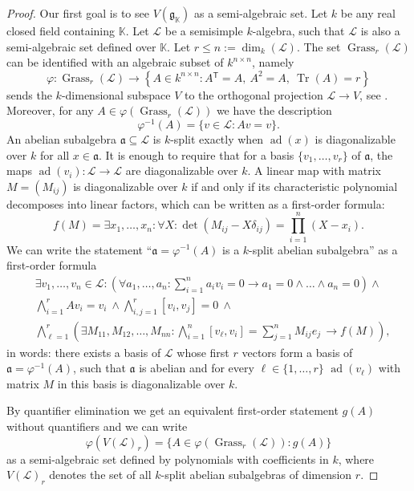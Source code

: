 \documentclass[12pt]{amsart}
\newcommand{\K}{\mathbb{K}}
\newcommand{\frakg}{\mathfrak{g}}
\newcommand{\fraka}{\mathfrak{a}}
\newcommand{\eL}{\mathcal{L}}
\newcommand{\tran}{{^{\mathsf{T}}\!}}
\numberwithin{equation}{section}
\theoremstyle{remark} %
\begin{document}
\begin{proof}
	Our first goal is to see $V(\frakg_\K)$ as a semi-algebraic set. Let $k$ be any real closed field containing $\K$. Let $\eL$ be a semisimple $k$-algebra, such that $\eL$ is also a semi-algebraic set defined over $\K$. Let $r \leq n := \operatorname{dim}_k(\eL)$. The set $\operatorname{Grass}_r(\eL)$ can be identified with an algebraic subset of $k^{n\times n}$, namely
	$$
	\varphi \colon \operatorname{Grass}_r(\eL) \to \left\{ A \in k^{n\times n} \colon A\tran = A,\  A^2=A,\ \operatorname{Tr}(A) = r \right\}
	$$
	sends the $k$-dimensional subspace $V$ to the orthogonal projection $\eL \to V$, see \cite[Theorem 3.4.4]{BCR}. Moreover, for any $A \in \varphi(\operatorname{Grass}_r(\eL))$ we have the description
	$$
	\varphi^{-1}(A) = \{ v \in \eL \colon Av = v \}.
	$$
	An abelian subalgebra $\fraka \subseteq \eL$ is $k$-split exactly when $\operatorname{ad}(x)$ is diagonalizable over $k$ for all $x \in \fraka$. It is enough to require that for a basis $\{v_1, \ldots , v_r\}$ of $\fraka$, the maps $\operatorname{ad}(v_i) \colon \eL \to \eL$ are diagonalizable over $k$. A linear map with matrix $M=(M_{ij})$ is diagonalizable over $k$ if and only if its characteristic polynomial decomposes into linear factors, which can be written as a first-order formula:
	$$
	f(M) = \exists x_1, \ldots , x_n \colon \forall X \colon  \det(M_{ij} - X\delta_{ij} ) = \prod_{i=1}^n (X-x_i).
	$$
	We can write the statement ``$\fraka = \varphi^{-1}(A)$ is a $k$-split abelian subalgebra'' as a first-order formula
	\begin{align*}
		& \exists v_1, \ldots , v_n \in \eL \colon \left( \forall a_1 , \ldots ,a_n \colon \sum_{i=1}^n a_i v_i = 0 \to a_1 = 0 \wedge \ldots \wedge a_n = 0\right) \wedge\\
		&\bigwedge_{i=1}^r Av_i = v_i \ \wedge  \bigwedge_{i,j=1}^r	[v_i,v_j] = 0 \ \wedge \\
		&
		\bigwedge_{\ell = 1}^r \left( \exists M_{11}, M_{12}, \ldots , M_{nn} \colon \bigwedge_{i=1}^n [v_\ell , v_i] = \sum_{j=1}^n M_{ij} e_j \, \rightarrow f(M) \right), 
	\end{align*}
	in words: there exists a basis of $\eL$ whose first $r$ vectors form a basis of $\fraka = \varphi^{-1}(A)$, such that $\fraka$ is abelian and for every $\ell \in \{1,\ldots, r\}$ $\operatorname{ad}(v_\ell)$ with matrix $M$ in this basis is diagonalizable over $k$.
	
	By quantifier elimination we get an equivalent first-order statement $g(A)$ without quantifiers and we can write 
	$$
	\varphi(V(\eL)_r) = \{A \in \varphi(\operatorname{Grass}_r(\eL)) \colon g(A) \}
	$$
	as a semi-algebraic set defined by polynomials with coefficients in $k$, where $V(\eL)_r$ denotes the set of all $k$-split abelian subalgebras of dimension $r$. 
	


\end{proof}
\end{document}
